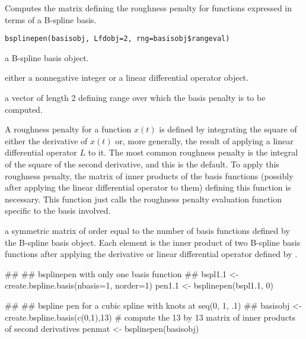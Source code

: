 \documentclass{article}
\begin{document}
\begin{Description}\relax
Computes the matrix defining the roughness penalty for functions
expressed in terms of a B-spline basis.
\end{Description}
\begin{Usage}
\begin{verbatim}
bsplinepen(basisobj, Lfdobj=2, rng=basisobj$rangeval)
\end{verbatim}
\end{Usage}
\begin{Arguments}
\begin{ldescription}
\item[\code{basisobj}] a B-spline basis object.

\item[\code{Lfdobj}] either a nonnegative integer or a linear differential operator object.

\item[\code{rng}] a vector of length 2 defining range over which the basis penalty is to
be computed.

\end{ldescription}
\end{Arguments}
\begin{Details}\relax
A roughness penalty for a function $x(t)$ is defined by
integrating the square of either the derivative of $x(t)$ or,
more generally, the result of applying a linear differential operator
$L$ to it.  The most common roughness penalty is the integral of
the square of the second derivative, and
this is the default. To apply this roughness penalty, the matrix of
inner products of the basis functions (possibly after applying the
linear differential operator to them) defining this function
is necessary. This function just calls the roughness penalty evaluation
function specific to the basis involved.
\end{Details}
\begin{Value}
a symmetric matrix of order equal to the number of basis functions
defined by the B-spline basis object.  Each element is the inner product
of two B-spline basis functions after applying the derivative or linear
differential operator defined by .
\end{Value}
\begin{Examples}
\begin{ExampleCode}
##
## bsplinepen with only one basis function
##
bspl1.1 <- create.bspline.basis(nbasis=1, norder=1)
pen1.1 <- bsplinepen(bspl1.1, 0) 

##
## bspline pen for a cubic spline with knots at seq(0, 1, .1)
##
basisobj <- create.bspline.basis(c(0,1),13)
#  compute the 13 by 13 matrix of inner products of second derivatives
penmat <- bsplinepen(basisobj)
\end{ExampleCode}
\end{Examples}
\end{document}
